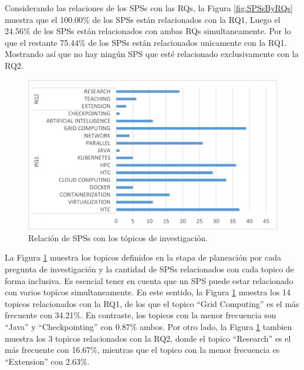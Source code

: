 Considerando las relaciones de los SPSs con las RQs, la Figura \ref{fig:SPSsByRQs} muestra que el 100.00\% de los SPSs están relacionados con la RQ1, Luego el 24.56\% de los SPSs están relacionados con ambas RQs simultaneamente. Por lo que el restante 75.44\% de los SPSs están relacionados unicamente con la RQ1. Mostrando así que no hay ningún SPS que esté relacionado exclusivamente con la RQ2.

\begin{figure}[htbp]
	\centering
	\vspace{10pt}
	\includegraphics[scale=0.7]{resources/figures/SPSsByTopic.jpg}
	\vspace{6pt}
	\caption{Relación de SPSs con los tópicos de investigación.}
	\label{fig:SPSsByTopics}
\end{figure}

La Figura \ref{fig:SPSsByTopics} muestra los topicos definidos en la etapa de planeación por cada pregunta de investigación y la cantidad de SPSs relacionados con cada topico de forma inclusiva. Es esencial tener en cuenta que un SPS puede estar relacionado con varios topicos simultaneamente. En este sentido, la Figura \ref{fig:SPSsByTopics} muestra los 14 topicos relacionados con la RQ1, de los que el topico ``Grid Computing'' es el más frecuente con 34.21\%. En contraste, los topicos con la menor frecuencia son ``Java'' y ``Checkpointing'' con 0.87\% ambos. Por otro lado, la Figura \ref{fig:SPSsByTopics} tambien muestra los 3 topicos relacionados con la RQ2, donde el topico ``Research'' es el más frecuente con 16.67\%, mientras que el topico con la menor frecuencia es ``Extension'' con 2.63\%.

